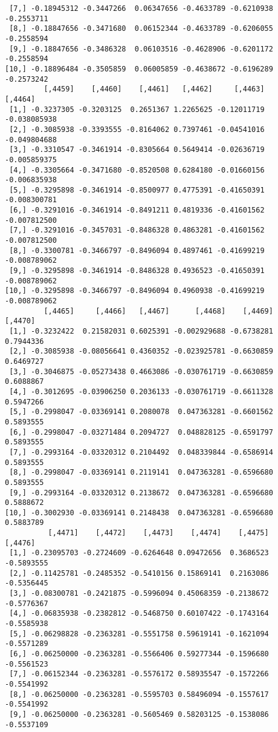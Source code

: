 \documentclass[
  letterpaper,
  DIV=11,
  numbers=noendperiod]{scrreprt}
\begin{document}
\begin{verbatim}
 [7,] -0.18945312 -0.3447266  0.06347656 -0.4633789 -0.6210938 -0.2553711
 [8,] -0.18847656 -0.3471680  0.06152344 -0.4633789 -0.6206055 -0.2558594
 [9,] -0.18847656 -0.3486328  0.06103516 -0.4628906 -0.6201172 -0.2558594
[10,] -0.18896484 -0.3505859  0.06005859 -0.4638672 -0.6196289 -0.2573242
         [,4459]    [,4460]    [,4461]   [,4462]     [,4463]      [,4464]
 [1,] -0.3237305 -0.3203125  0.2651367 1.2265625 -0.12011719 -0.038085938
 [2,] -0.3085938 -0.3393555 -0.8164062 0.7397461 -0.04541016 -0.049804688
 [3,] -0.3310547 -0.3461914 -0.8305664 0.5649414 -0.02636719 -0.005859375
 [4,] -0.3305664 -0.3471680 -0.8520508 0.6284180 -0.01660156 -0.006835938
 [5,] -0.3295898 -0.3461914 -0.8500977 0.4775391 -0.41650391 -0.008300781
 [6,] -0.3291016 -0.3461914 -0.8491211 0.4819336 -0.41601562 -0.007812500
 [7,] -0.3291016 -0.3457031 -0.8486328 0.4863281 -0.41601562 -0.007812500
 [8,] -0.3300781 -0.3466797 -0.8496094 0.4897461 -0.41699219 -0.008789062
 [9,] -0.3295898 -0.3461914 -0.8486328 0.4936523 -0.41650391 -0.008789062
[10,] -0.3295898 -0.3466797 -0.8496094 0.4960938 -0.41699219 -0.008789062
         [,4465]     [,4466]   [,4467]      [,4468]    [,4469]   [,4470]
 [1,] -0.3232422  0.21582031 0.6025391 -0.002929688 -0.6738281 0.7944336
 [2,] -0.3085938 -0.08056641 0.4360352 -0.023925781 -0.6630859 0.6469727
 [3,] -0.3046875 -0.05273438 0.4663086 -0.030761719 -0.6630859 0.6088867
 [4,] -0.3012695 -0.03906250 0.2036133 -0.030761719 -0.6611328 0.5947266
 [5,] -0.2998047 -0.03369141 0.2080078  0.047363281 -0.6601562 0.5893555
 [6,] -0.2998047 -0.03271484 0.2094727  0.048828125 -0.6591797 0.5893555
 [7,] -0.2993164 -0.03320312 0.2104492  0.048339844 -0.6586914 0.5893555
 [8,] -0.2998047 -0.03369141 0.2119141  0.047363281 -0.6596680 0.5893555
 [9,] -0.2993164 -0.03320312 0.2138672  0.047363281 -0.6596680 0.5888672
[10,] -0.3002930 -0.03369141 0.2148438  0.047363281 -0.6596680 0.5883789
          [,4471]    [,4472]    [,4473]    [,4474]    [,4475]    [,4476]
 [1,] -0.23095703 -0.2724609 -0.6264648 0.09472656  0.3686523 -0.5893555
 [2,] -0.11425781 -0.2485352 -0.5410156 0.15869141  0.2163086 -0.5356445
 [3,] -0.08300781 -0.2421875 -0.5996094 0.45068359 -0.2138672 -0.5776367
 [4,] -0.06835938 -0.2382812 -0.5468750 0.60107422 -0.1743164 -0.5585938
 [5,] -0.06298828 -0.2363281 -0.5551758 0.59619141 -0.1621094 -0.5571289
 [6,] -0.06250000 -0.2363281 -0.5566406 0.59277344 -0.1596680 -0.5561523
 [7,] -0.06152344 -0.2363281 -0.5576172 0.58935547 -0.1572266 -0.5541992
 [8,] -0.06250000 -0.2363281 -0.5595703 0.58496094 -0.1557617 -0.5541992
 [9,] -0.06250000 -0.2363281 -0.5605469 0.58203125 -0.1538086 -0.5537109

\end{verbatim}
\end{document}
